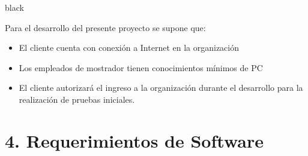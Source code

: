 \documentclass[11pt]{charter}
\begin{document}
\begin{consigna}{black}

Para el desarrollo del presente proyecto se supone que:
\begin{itemize}
\item El cliente cuenta con conexión a Internet en la organización
\item Los empleados de mostrador tienen conocimientos mínimos de PC
\item El cliente autorizará el ingreso a la organización durante el desarrollo para la realización de pruebas iniciales.

\end{itemize}


\end{consigna}

\section{4. Requerimientos de Software}
\label{sec:requerimientos}
\end{document}
